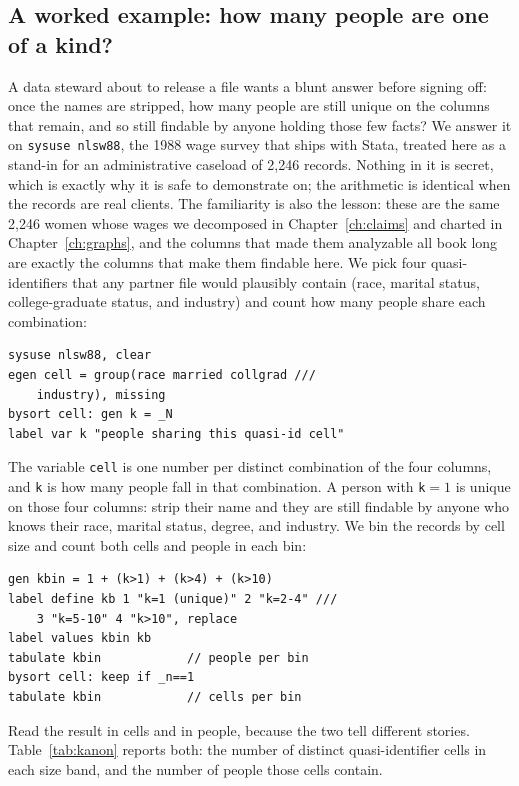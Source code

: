 \subsection{A worked example: how many people are one of a kind?}\label{sec:kanon}
A data steward about to release a file wants a blunt answer before signing off: once the names are stripped, how many people are still unique on the columns that remain, and so still findable by anyone holding those few facts? We answer it on \texttt{sysuse nlsw88}, the 1988 wage survey that ships with Stata, treated here as a stand-in for an administrative caseload of 2{,}246 records. Nothing in it is secret, which is exactly why it is safe to demonstrate on; the arithmetic is identical when the records are real clients. The familiarity is also the lesson: these are the same 2{,}246 women whose wages we decomposed in Chapter~\ref{ch:claims} and charted in Chapter~\ref{ch:graphs}, and the columns that made them analyzable all book long are exactly the columns that make them findable here. We pick four quasi-identifiers that any partner file would plausibly contain (race, marital status, college-graduate status, and industry) and count how many people share each combination:
\par
{\footnotesize
\begin{verbatim}
sysuse nlsw88, clear
egen cell = group(race married collgrad ///
    industry), missing
bysort cell: gen k = _N
label var k "people sharing this quasi-id cell"
\end{verbatim}
}
The variable \texttt{cell} is one number per distinct combination of the four columns, and \texttt{k} is how many people fall in that combination. A person with \texttt{k}${}=1$ is unique on those four columns: strip their name and they are still findable by anyone who knows their race, marital status, degree, and industry. We bin the records by cell size and count both cells and people in each bin:
\par
{\footnotesize
\begin{verbatim}
gen kbin = 1 + (k>1) + (k>4) + (k>10)
label define kb 1 "k=1 (unique)" 2 "k=2-4" ///
    3 "k=5-10" 4 "k>10", replace
label values kbin kb
tabulate kbin            // people per bin
bysort cell: keep if _n==1
tabulate kbin            // cells per bin
\end{verbatim}
}
Read the result in cells and in people, because the two tell different stories. Table~\ref{tab:kanon} reports both: the number of distinct quasi-identifier cells in each size band, and the number of people those cells contain.

